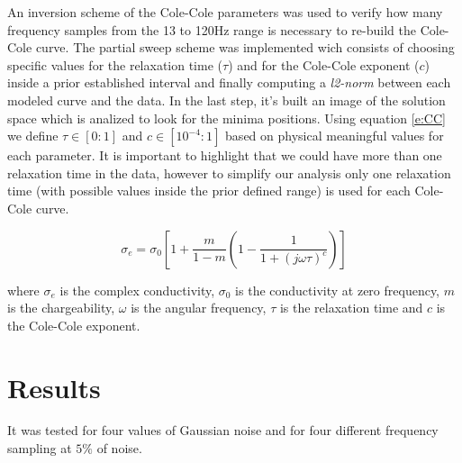 \documentclass{vie16}
\begin{document}
An inversion scheme of the Cole-Cole parameters was used to verify how
many frequency samples from the 13 to 120Hz range is necessary to
re-build the Cole-Cole curve. The partial sweep scheme was implemented
wich consists of choosing specific values for the relaxation time
($\tau$) and for the Cole-Cole exponent ($c$) inside a prior
established interval and finally computing a \textit{l2-norm} between
each modeled curve and the data. In the last step, it's built an image
of the solution space which is analized to look for the minima
positions.  Using equation \ref{e:CC} we define $\tau \in [0:1]$ and
$c \in [10^{-4}:1]$ based on physical meaningful values for each
parameter. It is important to highlight that we could have more than
one relaxation time in the data, however to simplify our analysis only
one relaxation time (with possible values inside the prior defined
range) is used for each Cole-Cole curve.

\begin{equation}
	\sigma_{e} = \sigma_{0}
			\left[
			1 + \frac{m}{1-m}
						\left( 
								1 - \frac{1}{1+ \left( j\omega\tau \right)^{c} }	
						\right) 			
			\right]
	\label{e:CC}
\end{equation}

where $\sigma_{e}$ is the complex conductivity, $\sigma_{0}$ is the
conductivity at zero frequency, $m$ is the chargeability, $\omega$ is the angular frequency, $\tau$ is the relaxation time and $c$ is the Cole-Cole exponent.

\section{Results}
It was tested for four values of Gaussian noise and for four different frequency sampling at $5\%$ of noise.
\end{document}
